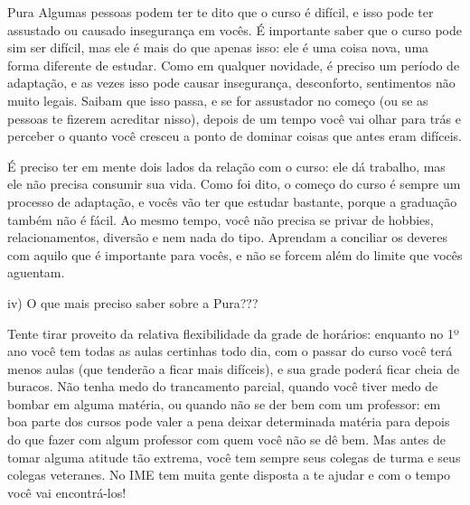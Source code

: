 \begin{subsecao}{Pura}
Algumas pessoas podem ter te dito que o curso é difícil, e isso pode ter assustado
ou causado insegurança em vocês. É importante saber que o curso pode sim ser difícil, mas
ele é mais do que apenas isso: ele é uma coisa nova, uma forma diferente de estudar. Como em 
qualquer novidade, é preciso um período de adaptação, e as vezes isso pode causar insegurança, 
desconforto, sentimentos não muito legais. Saibam que isso passa, e se for assustador no 
começo (ou se as pessoas te fizerem acreditar nisso), depois de um tempo você vai olhar
para trás e perceber o quanto você cresceu a ponto de dominar coisas que antes eram difíceis.

É preciso ter em mente dois lados da relação com o curso: ele dá trabalho, mas ele não
precisa consumir sua vida. Como foi dito, o começo do curso é sempre um processo de adaptação,
e vocês vão ter que estudar bastante, porque a graduação também não é fácil. Ao mesmo tempo, 
você não precisa se privar de hobbies, relacionamentos, diversão e nem nada do tipo. Aprendam 
a conciliar os deveres com aquilo que é importante para vocês, e não se forcem além do limite
que vocês aguentam.

iv) O que mais preciso saber sobre a Pura???

Tente tirar proveito da relativa flexibilidade da grade de horários: enquanto
no 1º ano você tem todas as aulas certinhas todo dia, com o passar do
curso você terá menos aulas (que tenderão a ficar mais difíceis), e sua
grade poderá ficar cheia de buracos. Não tenha medo do trancamento parcial,
quando você tiver medo de bombar em alguma matéria, ou quando não se der bem com
um professor: em boa parte dos cursos pode valer a pena deixar determinada
matéria para depois do que fazer com algum professor com quem você não se dê
bem. Mas antes de tomar alguma atitude tão extrema, você tem sempre seus colegas
de turma e seus colegas veteranes. No IME tem muita gente disposta a te ajudar e
com o tempo você vai encontrá-los!


\end{subsecao}
